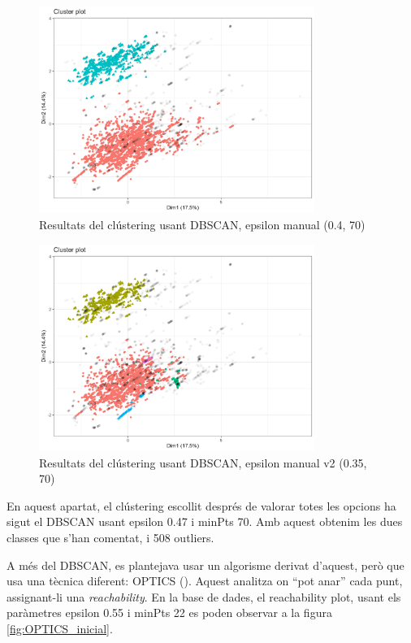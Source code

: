 \begin{figure}[H]
    \centering
    \includegraphics[width=0.8\textwidth]{Images/4_clustering/DBSCAN/dbscanforca.png}
    \caption{Resultats del clústering usant DBSCAN, epsilon manual (0.4, 70)}
    \label{fig:DBSCAN_manual}
\end{figure}

\begin{figure}[H]
    \centering
    \includegraphics[width=0.8\textwidth]{Images/4_clustering/DBSCAN/dbscanforcaalt.png}
    \caption{Resultats del clústering usant DBSCAN, epsilon manual v2 (0.35, 70)}
    \label{fig:DBSCAN_manual2}
\end{figure}

En aquest apartat, el clústering escollit després de valorar totes les opcions ha sigut el DBSCAN usant epsilon 0.47 i minPts 70. Amb aquest obtenim les dues classes que s'han comentat, i 508 outliers.

A més del DBSCAN, es plantejava usar un algorisme derivat d’aquest, però que usa una tècnica diferent: OPTICS (\cite{ankerst_1999_optics}). Aquest analitza on “pot anar” cada punt, assignant-li una \textit{reachability}. En la base de dades, el reachability plot, usant els paràmetres epsilon 0.55 i minPts 22 es poden observar a la figura \ref{fig:OPTICS_inicial}.

